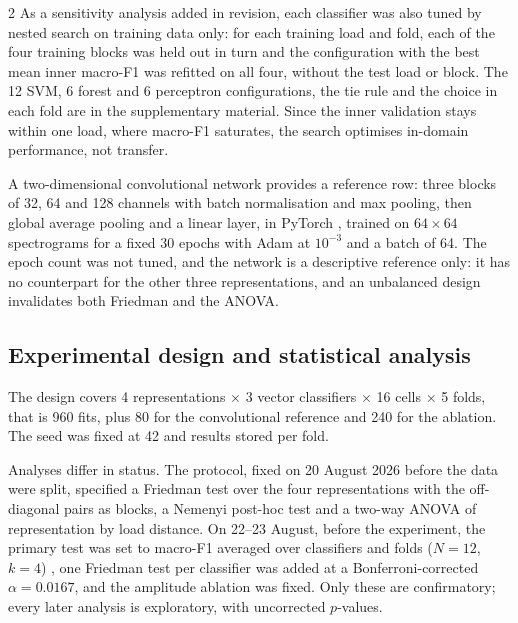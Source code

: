 \documentclass[12pt,twoside,titlepage]{ingenius}
\begin{document}
\begin{multicols}{2}
As a sensitivity analysis added in revision, each classifier was also tuned by
nested search on training data only: for each training load and fold, each of
the four training blocks was held out in turn and the configuration with the
best mean inner macro-F1 was refitted on all four, without the test load or
block. The 12 SVM, 6 forest and 6 perceptron configurations, the tie rule and
the choice in each fold are in the supplementary material. Since the inner
validation stays within one load, where macro-F1 saturates, the search
optimises in-domain performance, not transfer.

A two-dimensional convolutional network provides a reference row: three blocks
of 32, 64 and 128 channels with batch normalisation and max pooling, then global
average pooling and a linear layer, in PyTorch \cite{paszke2019}, trained on
$64\times64$ spectrograms for a fixed 30 epochs with Adam at $10^{-3}$ and a
batch of 64. The epoch count was not tuned, and the network is a descriptive reference only: it has no
counterpart for the other three representations, and an unbalanced design
invalidates both Friedman and the ANOVA.

\subsection{Experimental design and statistical analysis}

The design covers 4 representations $\times$ 3 vector classifiers $\times$ 16
cells $\times$ 5 folds, that is 960 fits, plus 80 for the convolutional
reference and 240 for the ablation. The seed was fixed at 42 and results stored
per fold. 

Analyses differ in status. The protocol, fixed on 20 August 2026 before the data
were split, specified a Friedman test over the four representations with the
off-diagonal pairs as blocks, a Nemenyi post-hoc test and a two-way ANOVA of
representation by load distance. On 22--23 August, before the experiment, the
primary test was set to macro-F1 averaged over classifiers and folds ($N = 12$,
$k = 4$) \cite{demsar2006}, one Friedman test per classifier was added at a
Bonferroni-corrected $\alpha = 0.0167$, and the amplitude ablation was fixed.
Only these are confirmatory; every later analysis is exploratory, with
uncorrected $p$-values.


\end{multicols}
\end{document}
